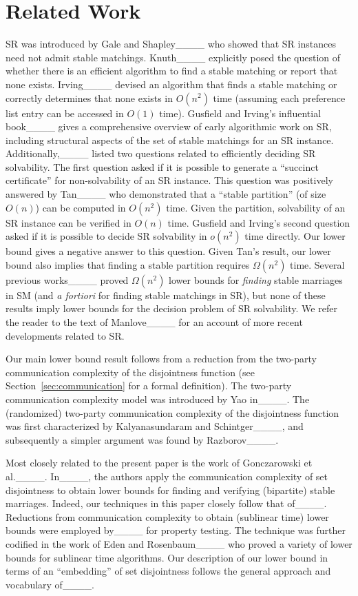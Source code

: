 \section{Related Work}
SR was introduced by Gale and Shapley____ who showed that SR instances need not admit stable matchings. Knuth____ explicitly posed the question of whether there is an efficient algorithm to find a stable matching or report that none exists. Irving____ devised an algorithm that finds a stable matching or correctly determines that none exists in $O(n^2)$ time (assuming each preference list entry can be accessed in $O(1)$ time). Gusfield and Irving's influential book____ gives a comprehensive overview of early algorithmic work on SR, including structural aspects of the set of stable matchings for an SR instance. Additionally,____ listed two questions related to efficiently deciding SR solvability. The first question asked if it is possible to generate a ``succinct certificate'' for non-solvability of an SR instance. This question was positively answered by Tan____ who demonstrated that a ``stable partition'' (of size $O(n)$) can be computed in $O(n^2)$ time. Given the partition, solvability of an SR instance can be verified in $O(n)$ time. Gusfield and Irving's second question asked if it is possible to decide SR solvability in $o(n^2)$ time directly. Our lower bound gives a negative answer to this question. Given Tan's result, our lower bound also implies that finding a stable partition requires $\Omega(n^2)$ time. Several previous works____ proved $\Omega(n^2)$ lower bounds for \emph{finding} stable marriages in SM (and \emph{a fortiori} for finding stable matchings in SR), but none of these results imply lower bounds for the decision problem of SR solvability. We refer the reader to the text of Manlove____ for an account of more recent developments related to SR.

Our main lower bound result follows from a reduction from the two-party communication complexity of the disjointness function (see Section~\ref{sec:communication} for a formal definition). The two-party communication complexity model was introduced by Yao in____. The (randomized) two-party communication complexity of the disjointness function was first characterized by Kalyanasundaram and Schintger____, and subsequently a simpler argument was found by Razborov____. 

Most closely related to the present paper is the work of Gonczarowski et al.____. In____, the authors apply the communication complexity of set disjointness to obtain lower bounds for finding and verifying (bipartite) stable marriages. Indeed, our techniques in this paper closely follow that of____. Reductions from communication complexity to obtain (sublinear time) lower bounds were employed by____ for property testing. The technique was further codified in the work of Eden and Rosenbaum____ who proved a variety of lower bounds for sublinear time algorithms. Our description of our lower bound in terms of an ``embedding'' of set disjointness follows the general approach and vocabulary of____.